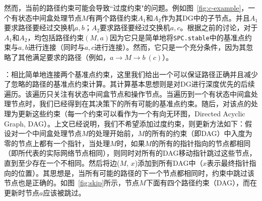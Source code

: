 \documentclass{ctexart}
\newcommand{\para}[1]{\noindent {\bf #1}}%
\newcommand{\codeword}[1]{\texttt{\small{#1}}}
\begin{document}
然而，当前的路径约束可能会导致``过度约束"的问题。例如图~\ref{fig:c-example}，一个有状态中间盒处理节点$M$有两个路径约束$A_1$和$A_2$作为其DG中的子节点。并且$A_1$要求路径要经过交换机$a, b$；$A_2$要求路径要经过交换机$a, c$。根据之前的讨论，对于$A_1$和$A_2$，均包括路径约束$(M, a)$因为它只是简单地将\codeword{SPC.stable}中的基准点约束与$a, b$进行连接（同时与$a, c$进行连接）。然而，它只是一个充分条件，因为其忽略了其他满足要求的路径（例如，$a \rightarrow M \rightarrow b\ (c)$）。


\para{基准点约束计算}：相比简单地连接两个基准点约束，这里我们给出一个可以保证路径正确并且减少了忽略的路径的基准点约束计算。其计算基本思想则是对DG进行深度优先的后续遍历。该遍历只关注有状态中间盒节点和操作节点。当遍历到一个有状态中间盒处理节点时，我们已经得到在其决策下的所有可能的基准点约束。随后，对该点的处理为更新这些约束（每一个约束可以看作为一个有向无环图，Directed Acyclic Graph, DAG）。上文已经说明，我们不希望添加过度约束，则更新方法如下：假设对一个中间盒处理节点$M$的处理开始前，$M$的所有的约束（即DAG）中入度为零的节点上都有一个指针，当处理$M$时，如果$M$的所有的指针指向的节点都相同（即所代表的实际网络节点相同），则同时对所有的DAG移动指针跳过这些节点，直到至少存在一个不相同。然后将边($M$, $x$)添加到所有DAG中（$x$表示最终指针指向的位置）。其思想是，当所有可能的路径的下一个节点都相同时，约束中跳过该节点也是正确的。如图~\ref{fig:skip}所示，节点$M$下面有四个路径约束（DAG），而在更新时节点$a$应该被跳过。
\end{document}
